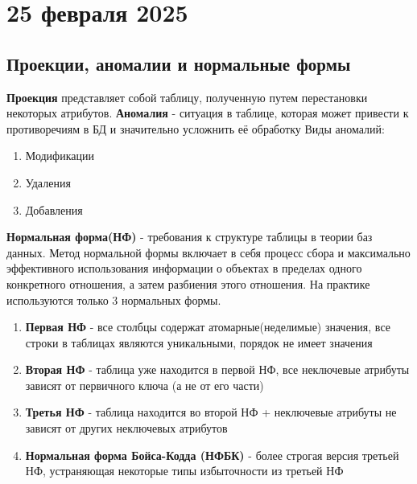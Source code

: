\documentclass[]{article}
\begin{document}
\section{25 февраля 2025}
\subsection{Проекции, аномалии и нормальные формы}
\textbf{Проекция }представляет собой таблицу, полученную путем перестановки некоторых атрибутов.
\newline
\textbf{Аномалия} - ситуация в таблице, которая может привести к противоречиям в БД и значительно усложнить её обработку
\newline
Виды аномалий: 
\begin{enumerate}
\item Модификации
\item Удаления
\item Добавления
\end{enumerate}
\textbf{Нормальная форма(НФ)} - требования к структуре таблицы в теории баз данных. 
Метод нормальной формы включает в себя процесс сбора и максимально эффективного использования информации о объектах в пределах одного конкретного отношения, а затем разбиения этого отношения. На практике используются только 3 нормальных формы.
\newline
\begin{enumerate}
\item \textbf{Первая НФ} - все столбцы содержат атомарные(неделимые) значения, все строки в таблицах являются уникальными, порядок не имеет значения
\item \textbf{Вторая НФ} - таблица уже находится в первой НФ, все неключевые атрибуты зависят от первичного ключа (а не от его части)
\item \textbf{Третья НФ} - таблица находится во второй НФ + неключевые атрибуты не зависят от других неключевых атрибутов
\item \textbf{Нормальная форма Бойса-Кодда (НФБК)} - более строгая версия третьей НФ, устраняющая некоторые типы избыточности из третьей НФ
\end{enumerate}
\end{document}
